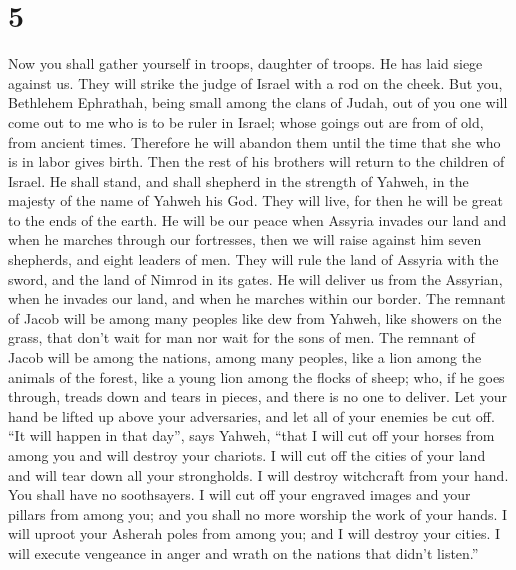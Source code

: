 \hypertarget{section-4}{%
\section{5}\label{section-4}}

 Now you shall gather yourself in troops, daughter of
troops. He has laid siege against us. They will strike the judge of
Israel with a rod on the cheek.  But you, Bethlehem
Ephrathah, being small among the clans of Judah, out of you one will
come out to me who is to be ruler in Israel; whose goings out are from
of old, from ancient times.  Therefore he will abandon
them until the time that she who is in labor gives birth. Then the rest
of his brothers will return to the children of Israel.  He
shall stand, and shall shepherd in the strength of Yahweh, in the
majesty of the name of Yahweh his God. They will live, for then he will
be great to the ends of the earth.  He will be our peace
when Assyria invades our land and when he marches through our
fortresses, then we will raise against him seven shepherds, and eight
leaders of men.  They will rule the land of Assyria with
the sword, and the land of Nimrod in its gates. He will deliver us from
the Assyrian, when he invades our land, and when he marches within our
border.  The remnant of Jacob will be among many peoples
like dew from Yahweh, like showers on the grass, that don't wait for man
nor wait for the sons of men.  The remnant of Jacob will
be among the nations, among many peoples, like a lion among the animals
of the forest, like a young lion among the flocks of sheep; who, if he
goes through, treads down and tears in pieces, and there is no one to
deliver.  Let your hand be lifted up above your
adversaries, and let all of your enemies be cut off. 
``It will happen in that day'', says Yahweh, ``that I will cut off your
horses from among you and will destroy your chariots.  I
will cut off the cities of your land and will tear down all your
strongholds.  I will destroy witchcraft from your hand.
You shall have no soothsayers.  I will cut off your
engraved images and your pillars from among you; and you shall no more
worship the work of your hands.  I will uproot your
Asherah poles from among you; and I will destroy your cities.
 I will execute vengeance in anger and wrath on the
nations that didn't listen.''

